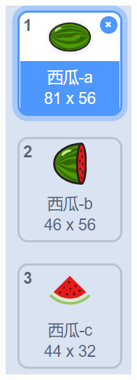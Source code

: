 \documentclass[10pt, a4paper]{article}
\begin{document}
\begin{enumerate}
        \begin{minipage}{.06\textwidth}
            \includegraphics[width=\textwidth]{12.png}

\end{minipage}
\end{enumerate}
\end{document}
